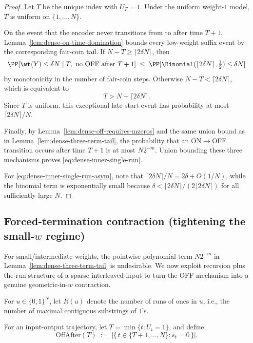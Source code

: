 \begin{proof}
Let $T$ be the unique index with $U_T=1$. Under the uniform weight-$1$ model, $T$ is uniform on $\{1,\dots,N\}$.

On the event that the encoder never transitions from \ON to \OFF after time $T+1$,
Lemma~\ref{lem:dense-on-time-domination} bounds every low-weight suffix event by the corresponding fair-coin tail.
If $N-T\ge \lceil 2\delta N\rceil$, then
\[
\PP[\wt(Y)\le \delta N \mid T,\ \text{no OFF after }T+1]
\;\le\;
\PP[\Binomial(\lceil 2\delta N\rceil,\tfrac12)\le \delta N]
\]
by monotonicity in the number of fair-coin steps. Otherwise $N-T<\lceil 2\delta N\rceil$, which is equivalent to
\[
T > N-\lceil 2\delta N\rceil.
\]
Since $T$ is uniform, this exceptional late-start event has probability at most $\lceil 2\delta N\rceil/N$.

Finally, by Lemma~\ref{lem:dense-off-requires-mzeros} and the same union bound as in Lemma~\ref{lem:dense-three-term-tail},
the probability that an ON$\to$OFF transition occurs after time $T+1$ is at most $N2^{-m}$.
Union bounding these three mechanisms proves \eqref{eq:dense-inner-single-run}.

For \eqref{eq:dense-inner-single-run-asym}, note that $\lceil 2\delta N\rceil/N = 2\delta + O(1/N)$, while the
binomial term is exponentially small because $\delta < \lceil 2\delta N\rceil/(2\lceil 2\delta N\rceil)$ for all
sufficiently large $N$.
\end{proof}

\subsection{Forced-termination contraction (tightening the small-$w$ regime)}
\label{subsec:inner-dense-forced-termination}

For small/intermediate weights, the pointwise polynomial term $N2^{-m}$ in Lemma~\ref{lem:dense-three-term-tail}
is undesirable. We now exploit recursion plus the run structure of a sparse interleaved input to turn the OFF mechanism
into a genuine geometric-in-$w$ contraction.

\begin{definition}
\label{def:runs}
For $u\in\{0,1\}^N$, let $R(u)$ denote the number of runs of ones in $u$,
i.e., the number of maximal contiguous substrings of $1$'s.
\end{definition}

\begin{definition}
\label{def:post-start-off-time}
For an input-output trajectory, let \(T=\min\{t:U_t=1\}\), and define
\[
\mathrm{OffAfter}(T)
\;:=\;
\bigl|\{\,t\in\{T+1,\dots,N\}: s_t=0\,\}\bigr|.
\]
\end{definition}

